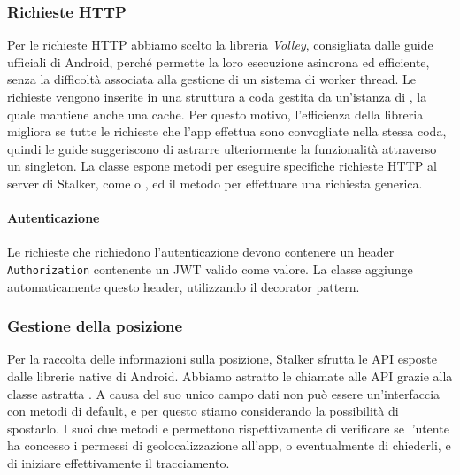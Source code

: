 \documentclass[../../manuale-manutentore.tex]{subfiles}
\begin{document}
\subsubsection{Richieste HTTP}%
\label{subs:richieste_http}

Per le richieste HTTP abbiamo scelto la libreria \textit{Volley}, consigliata dalle guide ufficiali di Android, perché permette la loro esecuzione asincrona ed efficiente, senza la difficoltà associata alla gestione di un sistema di worker thread.
Le richieste vengono inserite in una struttura a coda gestita da un'istanza di , la quale mantiene anche una cache.
Per questo motivo, l'efficienza della libreria migliora se tutte le richieste che l'app effettua sono convogliate nella stessa coda, quindi le guide suggeriscono di astrarre ulteriormente la funzionalità attraverso un singleton.
La classe  espone metodi per eseguire specifiche richieste HTTP al server di Stalker, come  o , ed il metodo  per effettuare una richiesta generica.

\paragraph{Autenticazione}%
\label{par:autenticazione}

Le richieste che richiedono l'autenticazione devono contenere un header \texttt{Authorization} contenente un JWT valido come valore.
La classe  aggiunge automaticamente questo header, utilizzando il decorator pattern.

\subsubsection{Gestione della posizione}%
\label{subs:gestione_della_posizione}

Per la raccolta delle informazioni sulla posizione, Stalker sfrutta le API esposte dalle librerie native di Android.
Abbiamo astratto le chiamate alle API grazie alla classe astratta .
A causa del suo unico campo dati non può essere un'interfaccia con metodi di default, e per questo stiamo considerando la possibilità di spostarlo.
I suoi due metodi  e  permettono rispettivamente di verificare se l'utente ha concesso i permessi di geolocalizzazione all'app, o eventualmente di chiederli, e di iniziare effettivamente il tracciamento.
\end{document}
